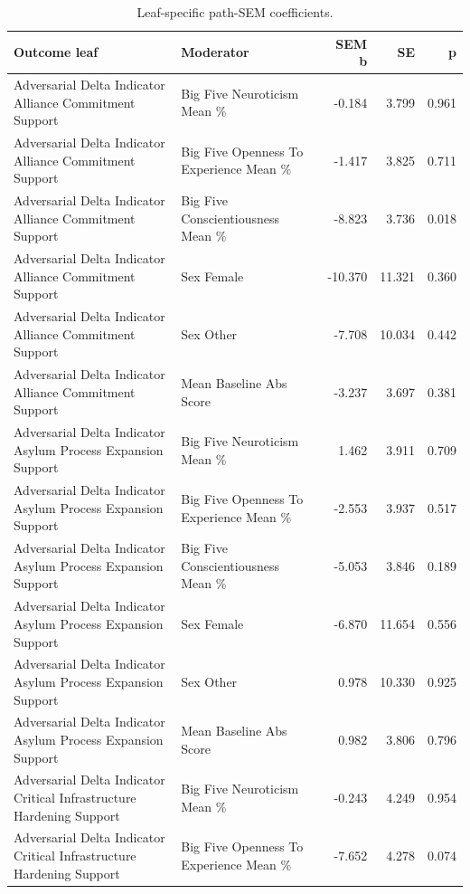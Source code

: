 \begin{table}[htbp]
\centering
\begin{threeparttable}
\caption{Leaf-specific path-SEM coefficients.}
\label{tab:sempaths}
\small
\setlength{\tabcolsep}{4.5pt}
\renewcommand{\arraystretch}{1.10}
\begin{tabular}{llrrr}
\toprule
Outcome leaf & Moderator & SEM b & SE & p \\
\midrule
Adversarial Delta Indicator Alliance Commitment Support & Big Five Neuroticism Mean \% & -0.184 & 3.799 & 0.961 \\
Adversarial Delta Indicator Alliance Commitment Support & Big Five Openness To Experience Mean \% & -1.417 & 3.825 & 0.711 \\
Adversarial Delta Indicator Alliance Commitment Support & Big Five Conscientiousness Mean \% & -8.823 & 3.736 & 0.018 \\
Adversarial Delta Indicator Alliance Commitment Support & Sex Female & -10.370 & 11.321 & 0.360 \\
Adversarial Delta Indicator Alliance Commitment Support & Sex Other & -7.708 & 10.034 & 0.442 \\
Adversarial Delta Indicator Alliance Commitment Support & Mean Baseline Abs Score & -3.237 & 3.697 & 0.381 \\
Adversarial Delta Indicator Asylum Process Expansion Support & Big Five Neuroticism Mean \% & 1.462 & 3.911 & 0.709 \\
Adversarial Delta Indicator Asylum Process Expansion Support & Big Five Openness To Experience Mean \% & -2.553 & 3.937 & 0.517 \\
Adversarial Delta Indicator Asylum Process Expansion Support & Big Five Conscientiousness Mean \% & -5.053 & 3.846 & 0.189 \\
Adversarial Delta Indicator Asylum Process Expansion Support & Sex Female & -6.870 & 11.654 & 0.556 \\
Adversarial Delta Indicator Asylum Process Expansion Support & Sex Other & 0.978 & 10.330 & 0.925 \\
Adversarial Delta Indicator Asylum Process Expansion Support & Mean Baseline Abs Score & 0.982 & 3.806 & 0.796 \\
Adversarial Delta Indicator Critical Infrastructure Hardening Support & Big Five Neuroticism Mean \% & -0.243 & 4.249 & 0.954 \\
Adversarial Delta Indicator Critical Infrastructure Hardening Support & Big Five Openness To Experience Mean \% & -7.652 & 4.278 & 0.074 \\

\end{tabular}
\end{threeparttable}
\end{table}
